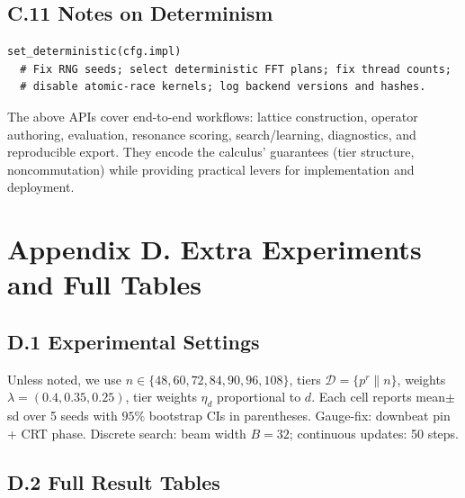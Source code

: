 \documentclass[12pt]{article}
\numberwithin{equation}{section}
\theoremstyle{plain}
\theoremstyle{definition}
\theoremstyle{remark}
\begin{document}
\subsection*{C.11 Notes on Determinism}
\begin{verbatim}
set_deterministic(cfg.impl)
  # Fix RNG seeds; select deterministic FFT plans; fix thread counts;
  # disable atomic-race kernels; log backend versions and hashes.
\end{verbatim}

\medskip
\noindent The above APIs cover end-to-end workflows: lattice construction, operator authoring, evaluation, resonance scoring, search/learning, diagnostics, and reproducible export. They encode the calculus’ guarantees (tier structure, noncommutation) while providing practical levers for implementation and deployment.

\section*{Appendix D. Extra Experiments and Full Tables}

\subsection*{D.1 Experimental Settings}
Unless noted, we use $n\in\{48,60,72,84,90,96,108\}$, tiers $\mathcal{D}=\{p^r\parallel n\}$, weights $\lambda=(0.4,0.35,0.25)$, tier weights $\eta_d$ proportional to $d$. Each cell reports mean$\pm$sd over 5 seeds with $95\%$ bootstrap CIs in parentheses. Gauge-fix: downbeat pin + CRT phase. Discrete search: beam width $B=32$; continuous updates: 50 steps.

\subsection*{D.2 Full Result Tables}
\end{document}
